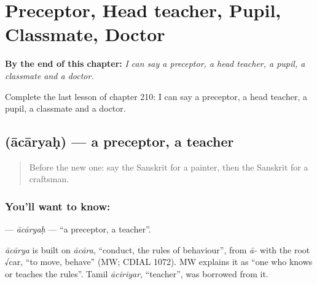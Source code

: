 
\chapter{Preceptor, Head teacher, Pupil, Classmate, Doctor}
\label{ch:sa-preceptor-head-teacher-pupil-classmate-doctor}

\begin{chapteropening}
\textbf{By the end of this chapter:} \emph{I can say a preceptor, a head teacher, a pupil, a classmate and a doctor.}

Complete the last lesson of chapter 210: I can say a preceptor, a head teacher, a pupil, a classmate and a doctor.
\end{chapteropening}

\section[\texorpdfstring{\sk{आचार्यः} (ācāryaḥ)}{आचार्यः (ācāryaḥ)}]{ (ācāryaḥ) — a preceptor, a teacher}

\label{lesson:SA-C210-acaryah}



\begin{quote}
Before the new one: say the Sanskrit for a painter, then the Sanskrit for a craftsman.
\end{quote}

\subsection*{You'll want to know: }
\textbf{} — \emph{ācāryaḥ} — \textquotedblleft{}a preceptor, a teacher\textquotedblright{}.

\begin{cousinweb}
\emph{ācārya} is built on \emph{ācāra}, \textquotedblleft{}conduct, the rules of behaviour\textquotedblright{}, from \emph{ā-} with the root √car, \textquotedblleft{}to move, behave\textquotedblright{} (MW; CDIAL 1072). MW explains it as \textquotedblleft{}one who knows or teaches the rules\textquotedblright{}. Tamil \emph{āciriyar}, \textquotedblleft{}teacher\textquotedblright{}, was borrowed from it.
\end{cousinweb}

